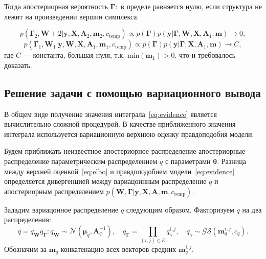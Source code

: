 Тогда апостериорная вероятность $\boldsymbol{\Gamma}:$ в пределе равняется нулю, если структура не лежит на произведении вершин симплекса.

$$p(\boldsymbol{\Gamma}_2, \mathbf{W}+2|\mathbf{y}, \mathbf{X},\mathbf{A}_2,\mathbf{m}_2, {c_\text{temp}}) \propto p(\boldsymbol{\Gamma}) p(\mathbf{y} |\boldsymbol{\Gamma},   \mathbf{W}, \mathbf{X},\mathbf{A}_1,\mathbf{m}) \to 0,$$
$$p(\boldsymbol{\Gamma}_1,  \mathbf{W}_1|\mathbf{y}, \mathbf{W}, \mathbf{X},\mathbf{A}_1,\mathbf{m}_1, {c_\text{temp}}) \propto p(\boldsymbol{\Gamma}) p(\mathbf{y} |\boldsymbol{\Gamma},  \mathbf{X},\mathbf{A}_1,\mathbf{m}) \to C,$$
где $C$ --- константа, большая нуля, т.к. $ \text{min}(\mathbf{m}_1)>0$.
что и требовалось доказать.

\subsection{Решение задачи с помощью вариационного вывода}
В общем виде получение значения интеграла~\eqref{eq:evidence} является вычислительно сложной процедурой. В качестве приближенного значения интеграла используется вариационную верхнюю оценку правдоподобия модели. 

Будем приближать неизвестное апостериорное распределение апостериорные распределение параметрическим распределением $q$ с параметрами $\boldsymbol{\theta}$.
Разница между верхней оценкой~\eqref{eq:elbo} и правдоподобием модели~\eqref{eq:evidence} определяется дивергенцией между вариацоинным распределение $q$ и апостериорным распределением $p(\mathbf{W}, \boldsymbol{\Gamma}|\mathbf{y}, \mathbf{X}, \mathbf{A},\mathbf{m}, c_{\text{temp}})$. 

Зададим вариацонное распределение $q$ следующим образом. 
Факторизуем $q$ на два распределения: 
$$q = q_{\mathbf{W}}q_{\boldsymbol{\Gamma}}:
q_{\mathbf{W}} \sim \mathcal{N}(\boldsymbol{\mu}_q, \mathbf{A}^{-1}_q), \quad q_{\boldsymbol{\Gamma}} = \prod_{(i,j) \in E} q_\gamma^{i,j}, \quad q_\gamma \sim \mathcal{GS}( \mathbf{m}_q^{i,j}, c_q).$$
Обозначим за $\mathbf{m}_q$ конкатенацию всех векторов средних  $\mathbf{m}_q^{i,j}$.


